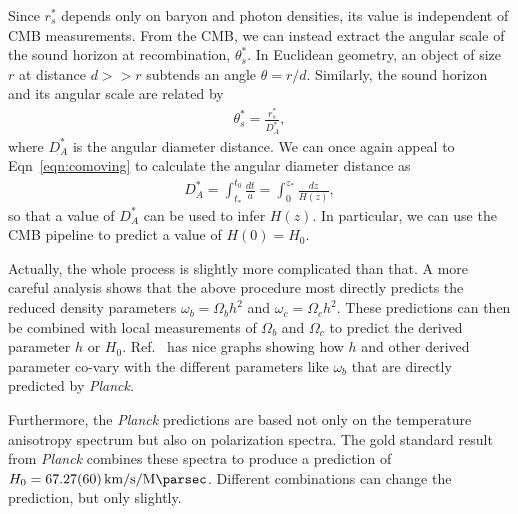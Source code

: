 \documentclass[12pt]{article}
\newcommand{\units}{\kilo\meter\per\second\per\mega\parsec}
\newcommand{\hnaught}[1]{\SI{#1}{\units}}
\newcommand{\Planck}[1]{\textit{Planck}}
\begin{document}
Since $r^*_s$ depends only on baryon and photon densities, its value is independent of CMB measurements. From the CMB, we can instead extract the angular scale of the sound horizon at recombination, $\theta_s^*$. 
In Euclidean geometry, an object of size $r$ at distance $d>>r$ subtends an angle $\theta = r/d$.
Similarly, the sound horizon and its angular scale are related by
\begin{align}
\theta_s^* = \frac{r_s^*}{D_A^*},
\end{align}
where $D_A^*$ is the angular diameter distance.
We can once again appeal to Eqn~\ref{eqn:comoving} to calculate the angular diameter distance as~\cite{Samtleben2007, DiValentino2021}
\begin{align}
D_A^* = \int_{t_*}^{t_0}\frac{dt}{a} =  \int_0^{z_*}\frac{dz}{H(z)}, \label{eqn:distance}
\end{align}
so that a value of $D_A^*$ can be used to infer $H(z)$. In particular, we can use the CMB pipeline to predict a value of $H(0) = H_0$.

Actually, the whole process is slightly more complicated than that. A more careful analysis shows that the above procedure most directly predicts the reduced density parameters $\omega_b = \Omega_bh^2$ and $\omega_c = \Omega_c h^2$. These predictions can then be combined with local measurements of $\Omega_b$ and $\Omega_c$ to predict the derived parameter $h$ or $H_0$. Ref.~\cite{Planck2018} has nice graphs showing how $h$ and other derived parameter co-vary with the different parameters like $\omega_b$ that are directly predicted by \textit{Planck}. 

Furthermore, the \Planck{} predictions are based not only on the temperature anisotropy spectrum but also on polarization spectra. The gold standard result from \Planck{} combines these spectra to produce a prediction of ${H_0 = \hnaught{67.27 \pm 0.6}}$. Different combinations can change the prediction, but only slightly.
\end{document}
